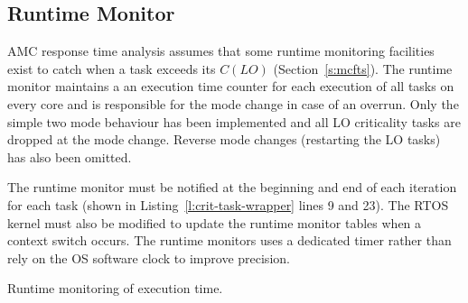 \subsection{Runtime Monitor}

	AMC response time analysis assumes that some runtime monitoring facilities exist to catch when a task exceeds its $C(LO)$ (Section~\ref{s:mcfts}). 
	The runtime monitor maintains a an execution time counter for each execution of all tasks on every core and is responsible for the mode change in case of an overrun.
	Only the simple two mode behaviour has been implemented and all LO criticality tasks are dropped at the mode change. 
	Reverse mode changes (restarting the LO tasks) has also been omitted.

	The runtime monitor must be notified at the beginning and end of each iteration for each task (shown in Listing~\ref{l:crit-task-wrapper} lines 9 and 23). 
	The RTOS kernel must also be modified to update the runtime monitor tables when a context switch occurs. 
	The runtime monitors uses a dedicated timer rather than rely on the OS software clock to improve precision.

\begin{algorithm}
	\caption{Runtime monitoring of execution time.}
	\label{a:run-mon}
\end{algorithm}
 



% 
% 
% 
	



% 
% 
% 







